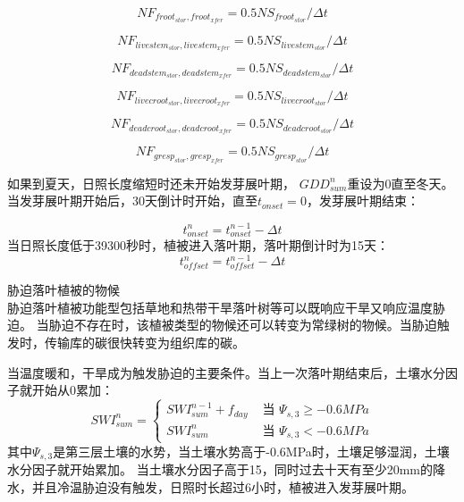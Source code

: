 \begin{equation}
  NF_{froot_{stor},froot_{xfer}}=0.5  NS_{froot_{stor}}/\Delta t
\end{equation}

\begin{equation}
  NF_{livestem_{stor},livestem_{xfer}}=0.5  NS_{livestem_{stor}}/\Delta t
\end{equation}

\begin{equation}
  NF_{deadstem_{stor},deadstem_{xfer}}=0.5 NS_{deadstem_{stor}}/\Delta t
\end{equation}

\begin{equation}
  NF_{livecroot_{stor},livecroot_{xfer}}=0.5  NS_{livecroot_{stor}}/\Delta t
\end{equation}

\begin{equation}
  NF_{deadcroot_{stor},deadcroot_{xfer}}=0.5 NS_{deadcroot_{stor}}/\Delta t
\end{equation}

\begin{equation}
  NF_{gresp_{stor},gresp_{xfer}}=0.5 NS_{gresp_{stor}}/\Delta t
\end{equation}


如果到夏天，日照长度缩短时还未开始发芽展叶期，
$GDD_{sum}^n$重设为0直至冬天。当发芽展叶期开始后，30天倒计时开始，直至$t_{onset}=0$，发芽展叶期结束：

\begin{equation}
t_{onset}^n=t_{onset}^{n-1}-\Delta t
\end{equation}
当日照长度低于39300秒时，植被进入落叶期，落叶期倒计时为15天：
\begin{equation}
  t_{offset}^n=t_{offset}^{n-1}-\Delta t
\end{equation}

胁迫落叶植被的物候\\

胁迫落叶植被功能型包括草地和热带干旱落叶树等可以既响应干旱又响应温度胁迫。
当胁迫不存在时，该植被类型的物候还可以转变为常绿树的物候。当胁迫触发时，传输库的碳很快转变为组织库的碳。


当温度暖和，干旱成为触发胁迫的主要条件。当上一次落叶期结束后，土壤水分因子就开始从0累加：
\begin{equation}
SWI_{sum}^{n}=\left\{\begin{array}{ll}SWI_{sum}^{n-1}+f_{d a y} & \text{ 当 } \Psi_{s, 3} \geq-0.6 M P a \\ SWI_{sum}^{n} &  \text{ 当 } \Psi_{s, 3}<-0.6 M P a\end{array}\right.
\end{equation}
其中$\Psi_{s,3}$是第三层土壤的水势，当土壤水势高于-0.6MPa时，土壤足够湿润，土壤水分因子就开始累加。
当土壤水分因子高于15，同时过去十天有至少20mm的降水，并且冷温胁迫没有触发，日照时长超过6小时，植被进入发芽展叶期。


